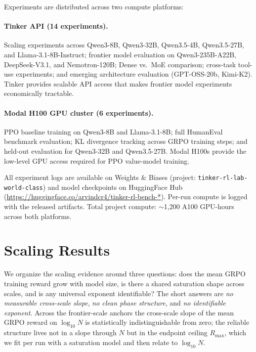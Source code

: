 \documentclass{article}
\begin{document}
Experiments are distributed across two compute platforms:

\paragraph{Tinker API (14 experiments).}
Scaling experiments across Qwen3-8B, Qwen3-32B, Qwen3.5-4B, Qwen3.5-27B,
and Llama-3.1-8B-Instruct; frontier model evaluation on Qwen3-235B-A22B,
DeepSeek-V3.1, and Nemotron-120B; Dense vs.~MoE comparison; cross-task
tool-use experiments; and emerging architecture evaluation (GPT-OSS-20b,
Kimi-K2). Tinker provides scalable API access that makes frontier model
experiments economically tractable.

\paragraph{Modal H100 GPU cluster (6 experiments).}
PPO baseline training on Qwen3-8B and Llama-3.1-8B; full HumanEval
benchmark evaluation; KL divergence tracking across GRPO training steps;
and held-out evaluation for Qwen3-32B and Qwen3.5-27B. Modal H100s
provide the low-level GPU access required for PPO value-model training.

All experiment logs are available on Weights \& Biases (project:
\texttt{tinker-rl-lab-world-class}) and model checkpoints on HuggingFace
Hub (\url{https://huggingface.co/arvindcr4/tinker-rl-bench-*}).
Per-run compute is logged with the released artifacts. Total project compute:
$\sim$1,200 A100 GPU-hours across both platforms.

 \section{Scaling Results}
\label{sec:p1-results}
We organize the scaling evidence around three questions: does the mean GRPO training reward grow
with model size, is there a shared saturation shape across scales, and is any
universal exponent identifiable? The short answers are \emph{no measurable
cross-scale slope}, \emph{no clean phase structure}, and \emph{no identifiable
exponent}. Across the frontier-scale anchors the cross-scale slope of the mean
GRPO reward on $\log_{10} N$ is statistically indistinguishable from zero; the
reliable structure lives not in a slope through $N$ but in the endpoint ceiling
$R_{\max}$, which we fit per run with a saturation model and then relate to
$\log_{10} N$.
\end{document}
